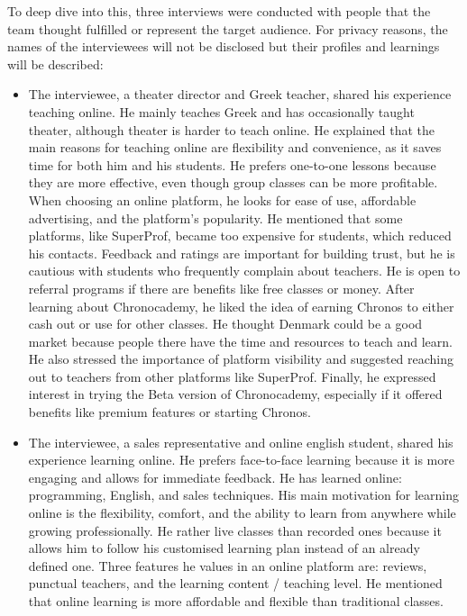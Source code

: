 To deep dive into this, three interviews were conducted with people that the team thought fulfilled or represent the target audience.
For privacy reasons, the names of the interviewees will not be disclosed but their profiles and learnings will be described:

\begin{itemize}
    \item The interviewee, a theater director and Greek teacher, shared his experience teaching online.
    He mainly teaches Greek and has occasionally taught theater, although theater is harder to teach online.
    He explained that the main reasons for teaching online are flexibility and convenience, as it saves time for both him and his students.
    He prefers one-to-one lessons because they are more effective, even though group classes can be more profitable.
    When choosing an online platform, he looks for ease of use, affordable advertising, and the platform’s popularity.
    He mentioned that some platforms, like SuperProf, became too expensive for students, which reduced his contacts.
    Feedback and ratings are important for building trust, but he is cautious with students who frequently complain about teachers.
    He is open to referral programs if there are benefits like free classes or money.
    After learning about Chronocademy, he liked the idea of earning Chronos to either cash out or use for other classes.
    He thought Denmark could be a good market because people there have the time and resources to teach and learn.
    He also stressed the importance of platform visibility and suggested reaching out to teachers from other platforms like SuperProf.
    Finally, he expressed interest in trying the Beta version of Chronocademy, especially if it offered benefits like premium features or starting Chronos.
    \item The interviewee, a sales representative and online english student, shared his experience learning online.
    He prefers face-to-face learning because it is more engaging and allows for immediate feedback.
    He has learned online: programming, English, and sales techniques.
    His main motivation for learning online is the flexibility, comfort, and the ability to learn from anywhere while growing professionally.
    He rather live classes than recorded ones because it allows him to follow his customised learning plan instead of an already defined one.
    Three features he values in an online platform are: reviews, punctual teachers, and the learning content / teaching level.
    He mentioned that online learning is more affordable and flexible than traditional classes.

\end{itemize}
